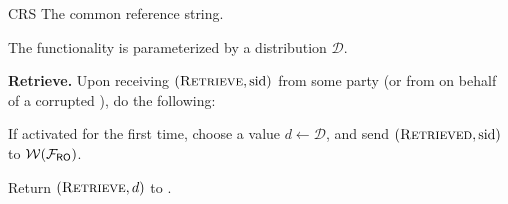 \begin{cccFunctionality}
    {\funcCRS}
    {CRS}
    {The common reference string.}

    The functionality is parameterized by a distribution $\mathcal{D}$.

    \begin{cccItemize}[noitemsep]
        \item \textbf{Retrieve.} Upon receiving $(\textsc{Retrieve}, \mathrm{sid})$ from some party \party (or from \adv on behalf of a corrupted \party), do the following:
        \begin{cccEnum}[nosep]
            \item If activated for the first time, choose a value $d \gets \mathcal{D}$, and send $(\textsc{Retrieved}, \mathrm{sid})$ to $\mathcal{W}(\mathcal{F}_{\textsf{RO}})$.

            \item Return $(\textsc{Retrieve}, d)$ to \party.
        \end{cccEnum}
    \end{cccItemize}
\end{cccFunctionality}